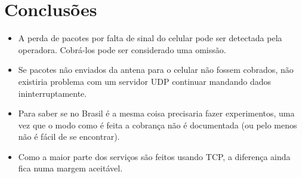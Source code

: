 \documentclass[brazil]{beamer}
\begin{document}
\section{Conclusões}
\begin{frame}[fragile]
    \begin{itemize}
        \item A perda de pacotes por falta de sinal do celular pode ser detectada pela operadora. Cobrá-los pode ser considerado uma omissão.
        \item Se pacotes não enviados da antena para o celular não fossem cobrados, não existiria problema com um servidor UDP continuar mandando dados ininterruptamente.
        \item Para saber se no Brasil é a mesma coisa precisaria fazer experimentos, uma vez que o modo como é feita a cobrança não é documentada (ou pelo menos não é fácil de se encontrar).
        \item Como a maior parte dos serviços são feitos usando TCP, a diferença ainda fica numa margem aceitável.
    \end{itemize}
\end{frame}
\end{document}
